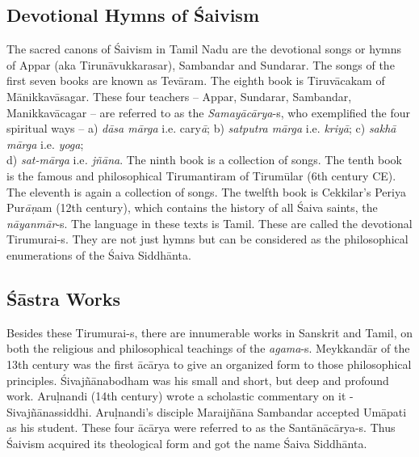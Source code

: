 \subsection*{Devotional Hymns of Śaivism}

\vskip -4pt

The sacred canons of Śaivism in Tamil Nadu are the devotional songs or hymns of Appar (aka Tirunāvukkarasar), Sambandar and Sundarar. The songs of the first seven books are known as Tevāram. The eighth book is Tiruvācakam of Mānikkavāsagar. These four teachers – Appar, Sundarar, Sambandar, Manikkavācagar -- are referred to as the \textit{Samayācārya}-s, who exemplified the four spiritual ways – a) \textit{dāsa mārga} i.e. cary\textit{ā}; b) \textit{satputra mārga} i.e. \textit{kriyā}; c) \textit{sakhā mārga} i.e. \textit{yoga};\\ d) \textit{sat-mārga} i.e\textit{. jñāna}. The ninth book is a collection of songs. The tenth book is the famous and philosophical Tirumantiram of Tirumūlar (6th century CE). The eleventh is again a collection of songs. The twelfth book is Cekkilar’s Periya Pur\textit{āṇ}am (12th century), which contains the history of all Śaiva saints, the \textit{nāyanmār}-s. The language in these texts is Tamil. These are called the devotional Tirumurai-s. They are not just hymns but can be considered as the philosophical enumerations of the Śaiva Siddhānta.


\subsection*{Śāstra Works}

\vskip -4pt

Besides these Tirumurai-s, there are innumerable works in Sanskrit and Tamil, on both the religious and philosophical teachings of the \textit{agama}-s. Meykkandār of the 13th century was the first ācārya to give an organized form to those philosophical principles. Śivajñānabodham was his small and short, but deep and profound work. Aruḷnandi (14th century) wrote a scholastic commentary on it - Sivajñānassiddhi. Aruḷnandi’s disciple Maraijñāna Sambandar accepted Umāpati as his student. These four ācārya were referred to as the Santānācārya-s. Thus Śaivism acquired its theological form and got the name Śaiva Siddhānta.


